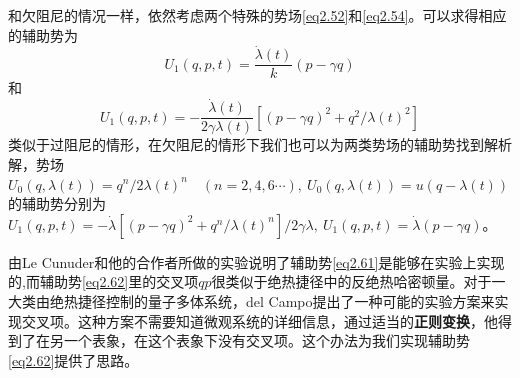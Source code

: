 和欠阻尼的情况一样，依然考虑两个特殊的势场\eqref{eq2.52}和\eqref{eq2.54}。可以求得相应的辅助势为
\begin{equation}
    U_{1}(q, p, t)=\frac{\dot{\lambda}(t)}{k}(p-\gamma q)
    \label{eq2.61}
\end{equation}
和
\begin{equation}
    U_{1}(q, p, t)=-\frac{\dot{\lambda}(t)}{2 \gamma \lambda(t)}\left[(p-\gamma q)^{2}+ q^{2}/\lambda(t)^2\right]
    \label{eq2.62}
\end{equation}
类似于过阻尼的情形，在欠阻尼的情形下我们也可以为两类势场的辅助势找到解析解\cite{Li2016}，势场$U_0 (q, \lambda(t))= q^{n} / 2 \lambda(t)^n \quad (n=2,4,6\cdots) ,\ U_{0}(q, \lambda(t))=u(q-\lambda(t))$的辅助势分别为$U_{1}(q, p, t) = - \dot{\lambda}\left[(p-\gamma q)^{2}+ q^{n}/\lambda(t)^n \right] / 2  \gamma \lambda ,\ U_{1}(q, p, t)=\dot{\lambda}(p-\gamma q)$。

由Le Cunuder和他的合作者\cite{LeCunuder2016}所做的实验说明了辅助势\eqref{eq2.61}是能够在实验上实现的,而辅助势\eqref{eq2.62}里的交叉项$qp$很类似于绝热捷径中的反绝热哈密顿量\cite{Jarzynski2013,Deffner2014,DelCampo2013}。对于一大类由绝热捷径控制的量子多体系统，del Campo提出了一种可能的实验方案来实现交叉项\cite{DelCampo2013}。这种方案不需要知道微观系统的详细信息，通过适当的\textbf{正则变换}，他得到了在另一个表象，在这个表象下没有交叉项。这个办法为我们实现辅助势\eqref{eq2.62}提供了思路。












